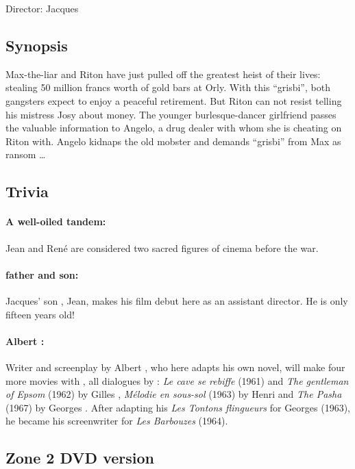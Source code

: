 Director: Jacques 

\subsection*{Synopsis}

Max-the-liar and Riton have just pulled off the greatest heist of their lives: stealing 50 million francs worth of gold bars at Orly. With this ``grisbi'', both gangsters expect to enjoy a peaceful retirement. But Riton can not resist telling his mistress Josy about money. The younger burlesque-dancer girlfriend passes the valuable information to Angelo, a drug dealer with whom she is cheating on Riton with. Angelo kidnaps the old mobster and demands ``grisbi'' from Max as ransom \dots{}

\subsection*{Trivia} 

\paragraph{A well-oiled tandem:} Jean  and René  are considered two sacred figures of cinema before the war.
\paragraph{ father and son:} Jacques' son , Jean, makes his film debut here as an assistant director. He is only fifteen years old!
\paragraph{Albert :} Writer and screenplay by Albert , who here adapts  his own novel, will make four more movies with , all dialogues by : \emph{Le cave se rebiffe} (1961) and \emph{The gentleman of Epsom} (1962) by Gilles , \emph{Mélodie en sous-sol} (1963) by Henri  and \emph{The Pasha} (1967) by Georges . After adapting his \emph{Les Tontons flingueurs} for Georges  (1963), he became his screenwriter for \emph{Les Barbouzes} (1964).

\subsection*{Zone 2 DVD version}

